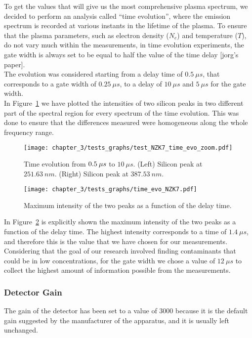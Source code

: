 To get the values that will give us the most comprehensive plasma spectrum, we decided to perform an analysis called “time evolution”, where the emission spectrum is recorded at various instants in the lifetime of the plasma. To ensure that the plasma parameters, such as electron density ($N_e$) and temperature ($T$), do not vary much within the measurements, in time evolution experiments, the gate width is always set to be equal to half the value of the time delay [jorg’s paper].
\\
The evolution was considered starting from a delay time of $0.5\: \mu s$, that corresponds to a gate width of $0.25 \: \mu s$, to a delay of $10 \: \mu s$ and $5 \: \mu s$ for the gate width.
\\
In Figure~\ref{fig:test_NZK7_time_evo_zoom} we have plotted the intensities of two silicon peaks in two different part of the spectral region for every spectrum of the time evolution. This was done to ensure that the differences measured were homogeneous along the whole frequency range.
\begin{figure}[H]
    \centering
    \texttt{[image: chapter\_3/tests\_graphs/test\_NZK7\_time\_evo\_zoom.pdf]} 
    \vspace*{-30pt}
    \caption[Time evolution.]{Time evolution from $\protect 0.5\: \mu s$ to $10 \: \mu s$. (Left) Silicon peak at $251.63 \: nm$. (Right) Silicon peak at $387.53 \: nm$.}
    \label{fig:test_NZK7_time_evo_zoom}
 \end{figure}

 \begin{figure}[H]
    \centering
    \texttt{[image: chapter\_3/tests\_graphs/time\_evo\_NZK7.pdf]} 
    \vspace*{-30pt}
    \caption{Maximum intensity of the two peaks as a function of the delay time.}
    \label{fig:time_evo_NZK7}
 \end{figure}
In Figure~\ref{fig:time_evo_NZK7} is explicitly shown the maximum intensity of the two peaks as a function of the delay time. The highest intensity corresponds to a time of $1.4 \: \mu s$, and therefore this is the value that we have chosen for our measurements.
\\
Considering that the goal of our research involved finding contaminants that could be in low concentrations, for the gate width we chose a value of $12 \: \mu s$ to collect the highest amount of information possible from the measurements.

\subsubsection{Detector Gain}
\label{subsubsec:detector_gain}
The gain of the detector has been set to a value of 3000 because it is the default gain suggested by the manufacturer of the apparatus, and it is usually left unchanged.

